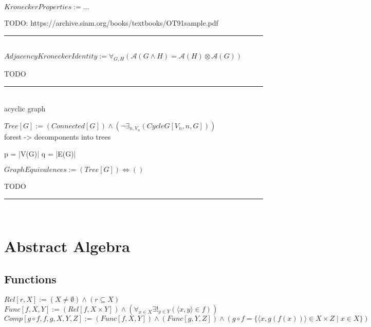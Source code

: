 \documentclass{book}
\newcommand{\abr}{:=}
\newcommand{\st}{\mathbin{|}}
\begin{document}
$KroneckerProperties \abr \ldots$
\begin{enumerate}
  \lit TODO: https://archive.siam.org/books/textbooks/OT91sample.pdf
\end{enumerate} \vspace{.75mm} \hrule \vspace{.75mm} \ \\

$AdjacencyKroneckerIdentity \abr \forall_{G, H}(\mathcal{A}(G \land H) = \mathcal{A}(H) \otimes \mathcal{A}(G))$
\begin{enumerate}
  \lit TODO
\end{enumerate} \vspace{.75mm} \hrule \vspace{.75mm} \ \\

acyclic graph

$Tree[G] \abr (Connected[G]) \land (\lnot \exists_{n, V_n}(CycleG[V_n, n, G]))$ \\

forest  -> decomponents into trees

p = |V(G)|
q = |E(G)|



$GraphEquivalences \abr (Tree[G]) \iff ()$ \\
\begin{enumerate}
  \lit TODO
\end{enumerate} \vspace{.75mm} \hrule \vspace{.75mm} \ \\














\chapter{Abstract Algebra}
\section{Functions}
$Rel[r, X] \abr (X \neq \emptyset) \land (r \subseteq X)$ \\
$Func[f, X, Y] \abr (Rel[f, X \times Y]) \land (\forall_{x \in X} \exists!_{y \in Y}(\langle x, y \rangle \in f))$ \\
$Comp[g \circ f, f, g, X, Y, Z] \abr (Func[f, X, Y]) \land (Func[g, Y, Z]) \land (g \circ f = \{\langle x, g(f(x)) \rangle \in X \times Z \st x \in X\})$ \\
\end{document}
